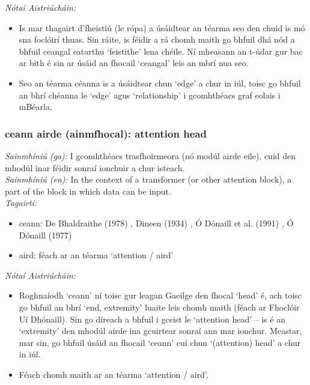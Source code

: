  \noindent \textit{Nótaí Aistriúcháin:}
\begin{itemize}
	\item Is mar thagairt d'fheistiú (le rópa) a úsáidtear an téarma seo den chuid is mó sna foclóirí thuas. Sin ráite, is féidir a rá chomh maith go bhfuil dhá nód a bhfuil ceangal eatarthu `feistithe' lena chéile. Ní mheasann an t-údar gur bac ar bith é sin ar úsáid an fhocail `ceangal' leis an mbrí nua seo.
	\item Seo an téarma céanna is a úsáidtear chun `edge' a chur in iúl, toisc go bhfuil an bhrí chéanna le `edge' agus `relationship' i gcomhthéacs graf eolais i mBéarla.
\end{itemize}


\subsubsection*{ceann airde (ainmfhocal): attention head}
 \noindent \textit{Sainmhíniú (ga):} I gcomhthéacs trasfhoirmeora (nó modúl airde eile), cuid den mhodúl inar féidir sonraí ionchuir a chur isteach.
\\
 \noindent \textit{Sainmhíniú (en):} In the context of a transformer (or other attention block), a part of the block in which data can be input.
\\
 \noindent \textit{Tagairtí:}
\begin{itemize}
	\item ceann: De Bhaldraithe (1978) \cite{de-bhaldraithe}, Dineen (1934) \cite{dineen}, Ó Dónaill et al. (1991) \cite{focloir-beag}, Ó Dónaill (1977) \cite{odonaill}
	\item aird: féach ar an téarma `attention / aird'
\end{itemize}

 \noindent \textit{Nótaí Aistriúcháin:}
\begin{itemize}
	\item Roghnaíodh `ceann' ní toisc gur leagan Gaeilge den fhocal `head' é, ach toisc go bhfuil an bhrí `end, extremity' luaite leis chomh maith (féach ar Fhoclóir Uí Dhónaill). Sin go díreach a bhfuil i gceist le `attention head' -- is é an `extremity' den mhodúl airde ina gcuirtear sonraí ann mar ionchur. Meastar, mar sin, go bhfuil úsáid an fhocail `ceann' cuí chun `(attention) head' a chur in iúl.
	\item Féach chomh maith ar an téarma `attention / aird'.
\end{itemize}


